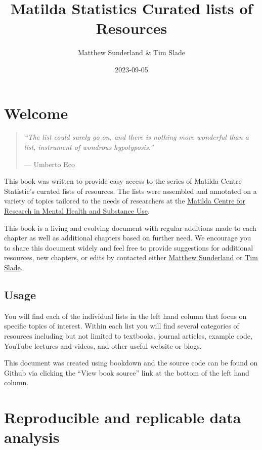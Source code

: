 \documentclass[
]{book}
\title{Matilda Statistics Curated lists of Resources}
\author{Matthew Sunderland \& Tim Slade}
\date{2023-09-05}
\begin{document}
\maketitle

{
\setcounter{tocdepth}{1}
\tableofcontents
}
\hypertarget{welcome}{%
\chapter{Welcome}\label{welcome}}

\begin{quote}
\emph{``The list could surely go on, and there is nothing more wonderful than a list, instrument of wondrous hypotyposis.''}

--- Umberto Eco
\end{quote}

This book was written to provide easy access to the series of Matilda Centre Statistic's curated lists of resources. The lists were assembled and annotated on a variety of topics tailored to the needs of researchers at the \href{https://www.sydney.edu.au/matilda-centre/}{Matilda Centre for Research in Mental Health and Substance Use}.

This book is a living and evolving document with regular additions made to each chapter as well as additional chapters based on further need. We encourage you to share this document widely and feel free to provide suggestions for additional resources, new chapters, or edits by contacted either \href{matthew.sunderland@sydney.edu.au}{Matthew Sunderland} or \href{tim.slade@sydney.edu.au}{Tim Slade}.

\hypertarget{usage}{%
\section{Usage}\label{usage}}

You will find each of the individual lists in the left hand column that focus on specific topics of interest. Within each list you will find several categories of resources including but not limited to textbooks, journal articles, example code, YouTube lectures and videos, and other useful website or blogs.

This document was created using bookdown and the source code can be found on Github via clicking the ``View book source'' link at the bottom of the left hand column.

\hypertarget{reproducible-and-replicable-data-analysis}{%
\chapter{Reproducible and replicable data analysis}\label{reproducible-and-replicable-data-analysis}}
\end{document}
